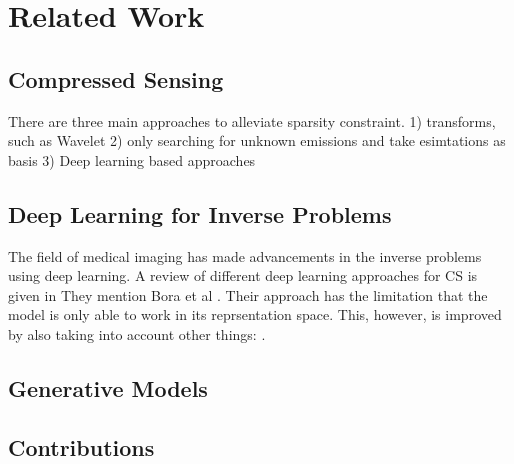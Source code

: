 
\chapter{Related Work}\label{chapter:related_work}

\section{Compressed Sensing}
There are three main approaches to alleviate sparsity constraint.
1) transforms, such as Wavelet
2) only searching for unknown emissions and take esimtations as basis
3) Deep learning based approaches

\section{Deep Learning for Inverse Problems}
The field of medical imaging has made advancements in the inverse problems using deep learning.
A review of different deep learning approaches for CS is given in \parencite{ReviewCSUsingAI}
They mention Bora et al \parencite{CSUsingAI}.
Their approach has the limitation that the model is only able to work in its reprsentation space.
This, however, is improved by also taking into account other things: \parencite{SparseCSUsingAI}.

\section{Generative Models}

\section{Contributions}
